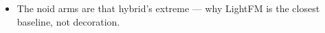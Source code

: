 \begin{itemize}
    \item The noid arms are that hybrid's extreme — why LightFM is the closest baseline, not decoration. 

\end{itemize}
